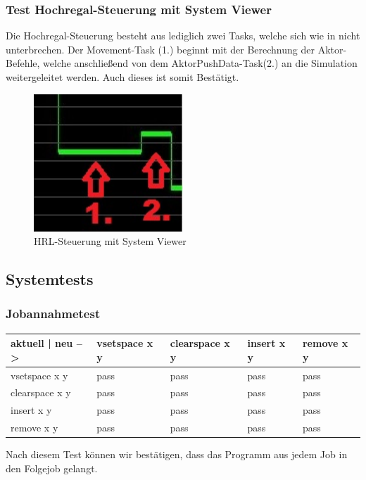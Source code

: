 \subsubsection{Test Hochregal-Steuerung mit System Viewer}
Die Hochregal-Steuerung besteht aus lediglich zwei Tasks, welche sich wie in  nicht unterbrechen. Der Movement-Task (1.) beginnt mit der Berechnung der Aktor-Befehle, welche anschließend von dem AktorPushData-Task(2.) an die Simulation weitergeleitet werden. Auch dieses ist somit Bestätigt.
\begin{figure}[H]
	\centering
  \includegraphics[width=0.5\textwidth]{diagrams/steuerung_zeit.jpg}
	\caption{HRL-Steuerung mit System Viewer}
	\label{fig5}
\end{figure}
\subsection {Systemtests}

\subsubsection {Jobannahmetest}
\begin{tabular}{|l|l|l|l|l|}
\hline
 aktuell | neu -->&  vsetspace x y & clearspace x y  & insert x y & remove x y\\
\hline
vsetspace	x y & pass & pass & pass  & pass\\
\hline
clearspace	x y & pass & pass & pass  & pass \\
\hline
insert 		x y & pass & pass & pass & pass\\
\hline
remove	x y & pass & pass & pass & pass\\
\hline
\end{tabular}

Nach diesem Test können wir bestätigen, dass das Programm aus jedem Job in den Folgejob gelangt.


